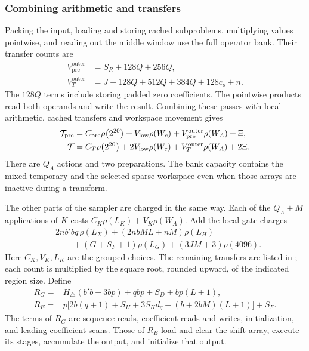 \documentclass[b5paper, 10pt, abstract=true, captions=tableheading]{scrartcl}
\theoremstyle{plain}
\theoremstyle{definition}
\begin{document}
\subsubsection{Combining arithmetic and transfers}
Packing the input, loading and storing cached subproblems, multiplying
values pointwise, and reading out the middle window use the full operator
bank. Their transfer counts are
\[
 \begin{split}
 V_{\mathrm{pre}}^{\mathrm{outer}}&=S_R+128Q+256Q,\\
 V_T^{\mathrm{outer}}&=J+128Q+512Q+384Q+128c_o+n.
 \end{split}
\]
The $128Q$ terms include storing padded zero coefficients. The pointwise
products read both operands and write the result. Combining these passes
with local arithmetic, cached transfers and workspace movement gives
\begin{equation}
 \begin{split}
 \mathcal T_{\mathrm{pre}}
 &=C_{\mathrm{pre}}\rho\!\left(2^{20}\right)+V_{\mathrm{low}}\rho\!\left(W_c\right)
       +V_{\mathrm{pre}}^{\mathrm{outer}}\rho\!\left(W_A\right)+\Xi,\\
 \mathcal T
 &=C_T\rho\!\left(2^{20}\right)+2V_{\mathrm{low}}\rho\!\left(W_c\right)
       +V_T^{\mathrm{outer}}\rho\!\left(W_A\right)+2\Xi.
 \end{split}
 \label{eq:wopt-toeplitzaccess}
\end{equation}
There are \(Q_A\) actions and two preparations. The bank capacity
contains the mixed temporary and the selected sparse workspace even
when those arrays are inactive during a transform.

The other parts of the sampler are charged in the same way. Each of the $Q_A+M$ applications of $K$
costs $C_K\rho(L_K)+V_K\rho(W_A)$. Add the local gate charges
\[
 \begin{split}
 &2nb' bq\,\rho(L_X)+(2nbML+nM)\rho(L_H)\\
 &\qquad +(G+S_F+1)\rho(L_G)+(3JM+3)\rho(4096).
 \end{split}
\]
Here $C_K,V_K,L_K$ are the grouped choices. The remaining transfers are
listed in ; each count is multiplied by the
square root, rounded upward, of the indicated region size.
Define
\[
\begin{split}
 R_G={}&H_{\triangle}(b' b+3bp)+qbp+S_D+bp(L+1),\\
 R_E={}&p\bigl[2b(q+1)+S_H+3S_Hd_q+(b+2bM)(L+1)\bigr]+S_F.
\end{split}
\]
The terms of $R_G$ are sequence reads, coefficient reads and writes,
initialization, and leading-coefficient scans. Those of $R_E$ load and
clear the shift array, execute its stages, accumulate the output, and
initialize that output.
\end{document}
